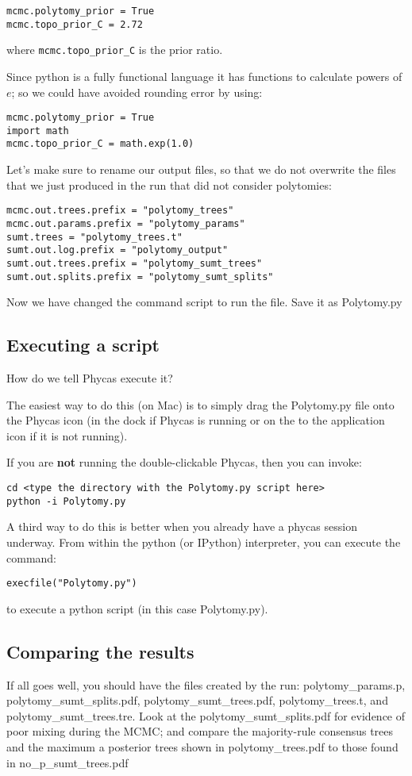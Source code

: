 \documentclass{article}
\newcommand{\cmd}[1]{\texttt{#1}\xspace}
\newcommand{\phycas}{Phycas\xspace}
\newcommand{\localfile}[1]{\textsf{#1}\xspace}
\begin{document}
\begin{verbatim}
mcmc.polytomy_prior = True
mcmc.topo_prior_C = 2.72
\end{verbatim}
where \cmd{mcmc.topo\_prior\_C} is the prior ratio.

Since python is a fully functional language it has functions to
calculate powers of $e$; so we could have avoided rounding 
error by using:
\begin{verbatim}
mcmc.polytomy_prior = True
import math
mcmc.topo_prior_C = math.exp(1.0)
\end{verbatim}

Let's make sure to rename our output files, so that we do not overwrite the files that we just produced
in the run that did not consider polytomies:
\begin{verbatim}
mcmc.out.trees.prefix = "polytomy_trees"
mcmc.out.params.prefix = "polytomy_params"
sumt.trees = "polytomy_trees.t"
sumt.out.log.prefix = "polytomy_output"
sumt.out.trees.prefix = "polytomy_sumt_trees"
sumt.out.splits.prefix = "polytomy_sumt_splits"
\end{verbatim}

Now we have changed the command script to run the file. Save it as \localfile{Polytomy.py}

\subsection{Executing a script}
How do we tell \phycas execute it?

The easiest way to do this (on Mac) is to simply drag the \localfile{Polytomy.py} file onto the \phycas icon (in the dock if \phycas is running or on the to the application icon if it is not running).

If you are {\bf not} running the double-clickable \phycas, then you can invoke:
\begin{verbatim}
cd <type the directory with the Polytomy.py script here>
python -i Polytomy.py
\end{verbatim}

A third way to do this is better when you already have a phycas session underway. 
From within the python (or IPython) interpreter, you can execute the command:
\begin{verbatim}
execfile("Polytomy.py")
\end{verbatim}
to execute a python script (in this case  \localfile{Polytomy.py}).

\subsection{Comparing the results}
If all goes well, you should have the files created by the run:
\localfile{polytomy\_params.p}, \localfile{polytomy\_sumt\_splits.pdf}, \localfile{polytomy\_sumt\_trees.pdf}, \localfile{polytomy\_trees.t}, and \localfile{polytomy\_sumt\_trees.tre}.
Look at the \localfile{polytomy\_sumt\_splits.pdf}  for evidence of poor mixing  during the MCMC; 
and compare the majority-rule consensus trees and the maximum a posterior trees shown in  \localfile{polytomy\_trees.pdf} to those found in \localfile{no\_p\_sumt\_trees.pdf}
\end{document}
